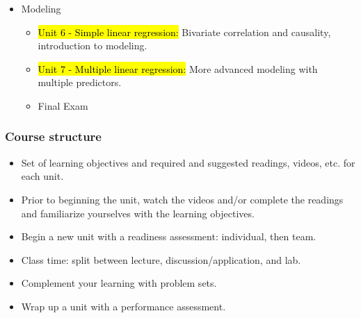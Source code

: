 \documentclass[11pt,containsverbatim,handout,xcolor=xelatex,dvipsnames,table]{beamer}
\begin{document}
\begin{frame}[shrink]
\begin{itemize}
\item Modeling
\begin{itemize}
\item \hl{Unit 6 - Simple linear regression:} Bivariate correlation and causality, 
introduction to modeling.
\item \hl{Unit 7 - Multiple linear regression:} More advanced modeling with multiple 
predictors.
\item Final Exam
\end{itemize}

\end{itemize}

\end{frame}


\begin{frame}
\frametitle{Course structure}

\begin{itemize}[<alert@+>]
\item Set of learning objectives and required and suggested readings, videos, etc. for 
each unit.
\item Prior to beginning the unit, watch the videos and/or complete the readings and 
familiarize yourselves with the learning objectives.
\item Begin a new unit with a readiness assessment: individual, then team.
\item Class time: split between lecture, discussion/application, and lab.
\item Complement your learning with problem sets.
\item Wrap up a unit with a performance assessment.
\end{itemize}

\end{frame}

\end{document}
